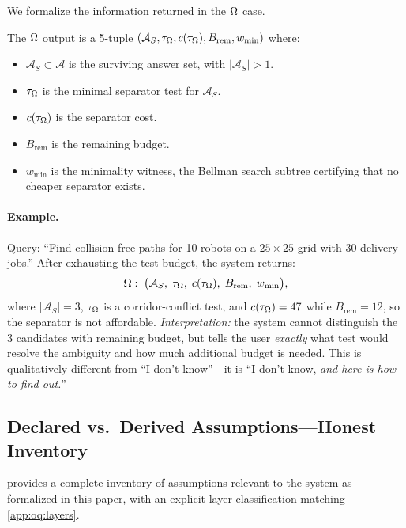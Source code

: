 We formalize the information returned in the $\Omega$ case.

\begin{definition}
\label{def:omega-payload}
The $\Omega$ output is a 5-tuple $(\mathcal{A}_S, \tau_\Omega, c(\tau_\Omega),
B_{\mathrm{rem}}, w_{\min})$ where:
\begin{itemize}[nosep]
  \item $\mathcal{A}_S \subset \mathcal{A}$ is the surviving answer set,
        with $|\mathcal{A}_S| > 1$.
  \item $\tau_\Omega$ is the minimal separator test for $\mathcal{A}_S$.
  \item $c(\tau_\Omega)$ is the separator cost.
  \item $B_{\mathrm{rem}}$ is the remaining budget.
  \item $w_{\min}$ is the minimality witness, the Bellman search subtree
        certifying that no cheaper separator exists.
\end{itemize}
\end{definition}

\paragraph{Example.}
Query: ``Find collision-free paths for 10 robots on a $25 \times 25$
grid with 30 delivery jobs.''  After exhausting the test budget, the
system returns:
\[
  \Omega:\;\bigl(\mathcal{A}_S,\; \tau_\Omega,\; c(\tau_\Omega),\;
  B_{\mathrm{rem}},\; w_{\min}\bigr),
\]
where $|\mathcal{A}_S| = 3$, $\tau_\Omega$ is a corridor-conflict test, and
$c(\tau_\Omega) = 47$ while $B_{\mathrm{rem}} = 12$, so the separator is
not affordable.
\emph{Interpretation:} the system cannot distinguish the 3 candidates
with remaining budget, but tells the user \emph{exactly} what test would
resolve the ambiguity and how much additional budget is needed.  This is
qualitatively different from ``I don't know''---it is ``I don't know,
\emph{and here is how to find out.}''

\subsection{Declared vs.\ Derived Assumptions---Honest Inventory}
\label{app:oq:assumptions}

 provides a complete inventory of assumptions
relevant to the system as formalized in this paper, with an explicit layer
classification matching \cref{app:oq:layers}.

